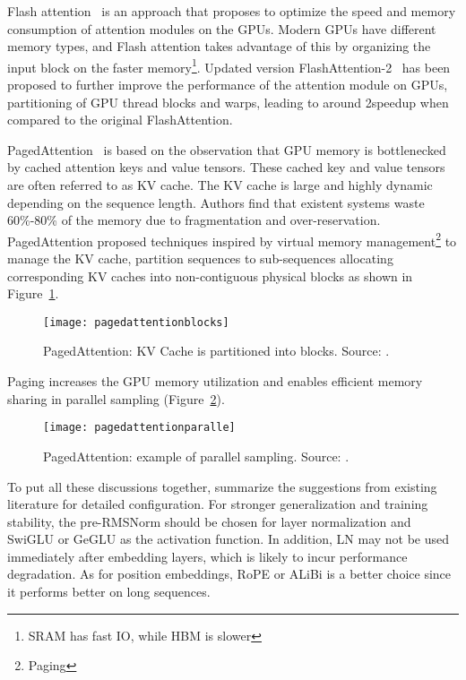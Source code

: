Flash attention~\cite{dao2022flashattention} is an approach that proposes to optimize the speed and memory consumption of attention modules on the GPUs.
Modern GPUs have different memory types, and Flash attention takes advantage of this by organizing the input block on the faster memory\footnote{SRAM has fast IO, while HBM is slower}.
Updated version FlashAttention-2~\cite{liu2022fast} has been proposed to further improve the performance of the attention module on GPUs, partitioning of GPU thread blocks and warps, leading to around 2\texttimes speedup when compared to the original FlashAttention.

PagedAttention~\cite{vllm2023} is based on the observation that GPU memory is bottlenecked by cached attention keys and value tensors.
These cached key and value tensors are often referred to as KV cache.
The KV cache is large and highly dynamic depending on the sequence length.
Authors find that existent systems waste 60\%-80\% of the memory due to fragmentation and over-reservation.
PagedAttention proposed techniques inspired by virtual memory management\footnote{Paging} to manage the KV cache, partition sequences to sub-sequences allocating corresponding KV caches into non-contiguous physical blocks as shown in Figure~\ref{fig:paging}.

\begin{figure}[h]
	\centering
	\texttt{[image: pagedattentionblocks]}
	\caption{PagedAttention: KV Cache is partitioned into blocks. Source: \textcite{vllm2023}.}
	\label{fig:paging}
\end{figure}

Paging increases the GPU memory utilization and enables efficient memory sharing in parallel sampling (Figure~\ref{fig:paging-parallel}).

\begin{figure}[h]
	\centering
	\texttt{[image: pagedattentionparalle]}
	\caption{PagedAttention: example of parallel sampling. Source: \textcite{vllm2023}.}
	\label{fig:paging-parallel}
\end{figure}

To put all these discussions together, \textcite{survey} summarize the suggestions from existing literature for detailed configuration.
For stronger generalization and training stability, the pre-RMSNorm should be chosen for layer normalization and SwiGLU or GeGLU as the activation function.
In addition, LN may not be used immediately after embedding layers, which is likely to incur performance degradation.
As for position embeddings, RoPE or ALiBi is a better choice since it performs better on long sequences.

